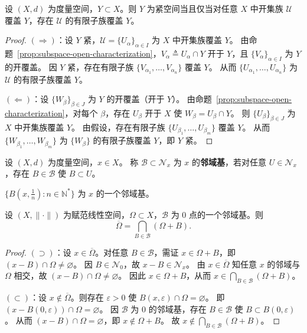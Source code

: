 \documentclass[lang=cn,a4paper,newtx,section]{elegantbook}
\begin{document}
\begin{proposition}
  设 $(X,d)$ 为度量空间，$Y\subset X$。则
  $Y$ 为紧空间当且仅当对任意 $X$ 中开集族 $\mathcal{U}$ 覆盖 $Y$，存在 $\mathcal{U}$ 的有限子族覆盖 $Y$。
\end{proposition}

\begin{proof}
  $(\Rightarrow)$：设 $Y$ 紧，$\mathcal{U}=\{U_\alpha\}_{\alpha\in I}$ 为 $X$ 中开集族覆盖 $Y$。
  由命题~\ref{prop:subspace-open-characterization}，$V_\alpha\triangleq U_\alpha\cap Y$ 开于 $Y$，且 $\{V_\alpha\}_{\alpha\in I}$ 为 $Y$ 的开覆盖。
  因 $Y$ 紧，存在有限子族 $\{V_{\alpha_1},\ldots,V_{\alpha_n}\}$ 覆盖 $Y$。
  从而 $\{U_{\alpha_1},\ldots,U_{\alpha_n}\}$ 为 $\mathcal{U}$ 的有限子族覆盖 $Y$。

  $(\Leftarrow)$：设 $\{W_\beta\}_{\beta\in J}$ 为 $Y$ 的开覆盖（开于 $Y$）。
  由命题~\ref{prop:subspace-open-characterization}，对每个 $\beta$，存在 $U_\beta$ 开于 $X$ 使 $W_\beta=U_\beta\cap Y$。
  则 $\{U_\beta\}_{\beta\in J}$ 为 $X$ 中开集族覆盖 $Y$。
  由假设，存在有限子族 $\{U_{\beta_1},\ldots,U_{\beta_m}\}$ 覆盖 $Y$。
  从而 $\{W_{\beta_1},\ldots,W_{\beta_m}\}$ 为 $\{W_\beta\}$ 的有限子族覆盖 $Y$，即 $Y$ 紧。
\end{proof}

\begin{definition}
  设 $(X,d)$ 为度量空间，$x\in X$。
  称 $\mathcal{B}\subset\mathcal{N}_x$ 为 $x$ 的\textbf{邻域基}，若对任意 $U\in\mathcal{N}_x$，存在 $B\in\mathcal{B}$ 使 $B\subset U$。
\end{definition}

\begin{example}
  $\{B(x,\frac{1}{n}):n\in\mathbb{N}^*\}$ 为 $x$ 的一个邻域基。
\end{example}

\begin{proposition}
  设 $(X,\|\cdot\|)$ 为赋范线性空间，$\Omega\subset X$，$\mathcal{B}$ 为 $0$ 点的一个邻域基。则
  \[
    \overline{\Omega}=\bigcap_{B\in\mathcal{B}}(\Omega+B).
  \]
\end{proposition}

\begin{proof}
  $(\supset)$：设 $x\in\overline{\Omega}$。对任意 $B\in\mathcal{B}$，需证 $x\in\Omega+B$，即 $(x-B)\cap\Omega\ne\varnothing$。
  因 $B\in\mathcal{N}_0$，故 $x-B\in\mathcal{N}_x$。
  由 $x\in\overline{\Omega}$ 知任意 $x$ 的邻域与 $\Omega$ 相交，故 $(x-B)\cap\Omega\ne\varnothing$。
  因此 $x\in\Omega+B$，从而 $x\in\bigcap_{B\in\mathcal{B}}(\Omega+B)$。

  $(\subset)$：设 $x\notin\overline{\Omega}$。则存在 $\varepsilon>0$ 使 $B(x,\varepsilon)\cap\Omega=\varnothing$。
  即 $(x-B(0,\varepsilon))\cap\Omega=\varnothing$。
  因 $\mathcal{B}$ 为 $0$ 的邻域基，存在 $B\in\mathcal{B}$ 使 $B\subset B(0,\varepsilon)$。
  从而 $(x-B)\cap\Omega=\varnothing$，即 $x\notin\Omega+B$。
  故 $x\notin\bigcap_{B\in\mathcal{B}}(\Omega+B)$。
\end{proof}
\end{document}
